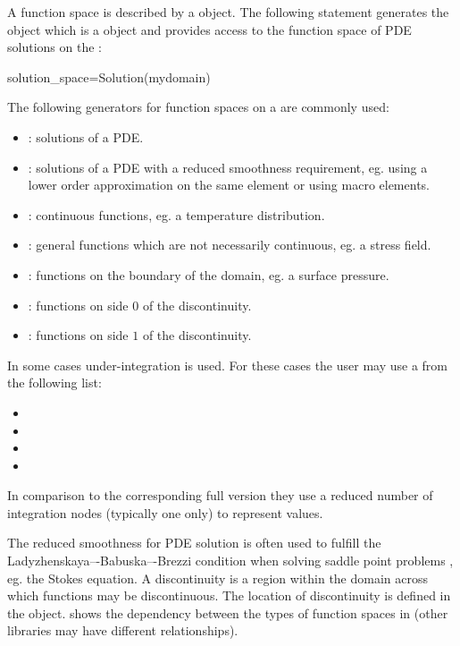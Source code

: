 A function space is described by a \FunctionSpace object.  The
following statement generates the object  which is
a \FunctionSpace object and provides access to the function space of
PDE solutions on the \Domain {}:

\begin{python}
  solution_space=Solution(mydomain)
\end{python}
The following generators for function spaces on a \Domain {} are commonly used: 
\begin{itemize}
\item {}: solutions of a PDE.
\item {}: solutions of a PDE with a reduced smoothness requirement, eg. using a
lower order approximation on the same element or using macro elements.  
\item {}: continuous functions, eg. a temperature distribution.
\item {}: general functions which are not necessarily continuous, eg. a stress field.
\item {}: functions on the boundary of the domain, eg. a surface pressure.
\item {}: functions on side $0$ of the discontinuity. 
\item {}: functions on side $1$ of the discontinuity.
\end{itemize}
In some cases under-integration is used. For these cases the user may use a
\FunctionSpace from the following list:
\begin{itemize}
\item {}
\item {}
\item {} 
\item {}
\end{itemize}
In comparison to the corresponding full version
they use a reduced number of integration nodes (typically one only) to represent values.


The reduced smoothness for PDE solution is often used to fulfill the Ladyzhenskaya–-Babuska–-Brezzi condition \cite{LBB} when 
solving saddle point problems , eg. the Stokes equation.
A discontinuity  is a region within the domain across which functions may be discontinuous.  
The location of discontinuity is defined in the \Domain object.
 shows the dependency between the types of function spaces in \finley (other libraries may have different relationships). 

